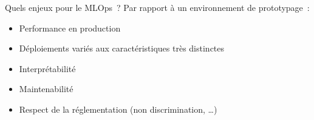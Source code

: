 \begin{frame}{Quels enjeux pour le MLOps~?}
  Par rapport à un environnement de prototypage~:

  \begin{itemize}
    \item Performance en production
    \item Déploiements variés aux caractéristiques très distinctes
    \item Interprétabilité
    \item Maintenabilité
    \item Respect de la réglementation (non discrimination, …)
  \end{itemize}
\end{frame}
